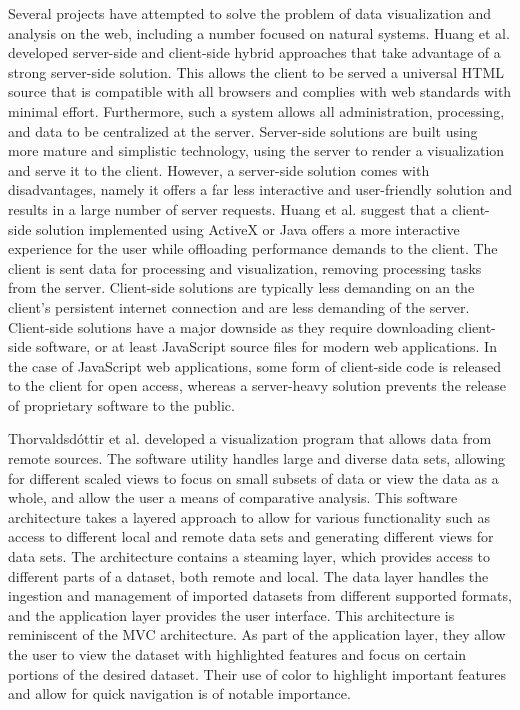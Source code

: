 %
%

Several projects have attempted to solve the problem of data visualization and analysis on the web, including a number focused on natural systems. Huang et al. \cite{gisvis} developed server-side and client-side hybrid approaches that take advantage of a strong server-side solution. This allows the client to be served a universal HTML source that is compatible with all browsers and complies with web standards with minimal effort.  Furthermore, such a system allows all administration, processing, and data to be centralized at the server. Server-side solutions are built using more mature and simplistic technology, using the server to render a visualization and serve it to the client. However, a server-side solution comes with disadvantages, namely it offers a far less interactive and user-friendly solution and results in a large number of server requests.  Huang et al. suggest that a client-side solution implemented using ActiveX or Java offers a more interactive experience for the user while offloading performance demands to the client.  The client is sent data for processing and visualization, removing processing tasks from the server. Client-side solutions are typically less demanding on an the client’s persistent internet connection and are less demanding of the server.  Client-side solutions have a major downside as they require downloading client-side software, or at least JavaScript source files for modern web applications. In the case of JavaScript web applications, some form of client-side code is released to the client for open access, whereas a server-heavy solution prevents the release of proprietary software to the public. \par
Thorvaldsdóttir et al. \cite{igv} developed a visualization program that allows data from remote sources.  The software utility handles large and diverse data sets, allowing for different scaled views to focus on small subsets of data or view the data as a whole, and allow the user a means of comparative analysis.  This software architecture takes a layered approach to allow for various functionality such as access to different local and remote data sets and generating different views for data sets. The architecture contains a steaming layer, which provides access to different parts of a dataset, both remote and local.  The data layer handles the ingestion and management of imported datasets from different supported formats, and the application layer provides the user interface.  This architecture is reminiscent of the MVC architecture. As part of the application layer, they allow the user to view the dataset with highlighted features and focus on certain portions of the desired dataset.  Their use of color to highlight important features and allow for quick navigation is of notable importance. \par
